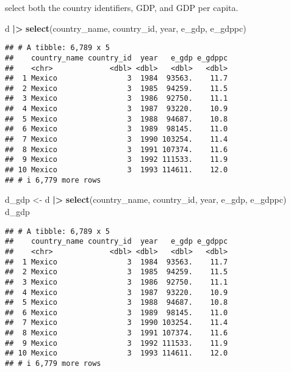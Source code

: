 \documentclass[
]{article}
\newenvironment{Shaded}{\begin{snugshade}}{\end{snugshade}}
\newcommand{\FunctionTok}[1]{\textcolor[rgb]{0.13,0.29,0.53}{\textbf{#1}}}
\newcommand{\NormalTok}[1]{#1}
\newcommand{\OtherTok}[1]{\textcolor[rgb]{0.56,0.35,0.01}{#1}}
\newcommand{\SpecialCharTok}[1]{\textcolor[rgb]{0.81,0.36,0.00}{\textbf{#1}}}
\begin{document}
select both the country identifiers, GDP, and GDP per capita.

\begin{Shaded}
\begin{Highlighting}[]
\NormalTok{d }\SpecialCharTok{|\textgreater{}} \FunctionTok{select}\NormalTok{(country\_name, country\_id, year, e\_gdp, e\_gdppc)}
\end{Highlighting}
\end{Shaded}

\begin{verbatim}
## # A tibble: 6,789 x 5
##    country_name country_id  year   e_gdp e_gdppc
##    <chr>             <dbl> <dbl>   <dbl>   <dbl>
##  1 Mexico                3  1984  93563.    11.7
##  2 Mexico                3  1985  94259.    11.5
##  3 Mexico                3  1986  92750.    11.1
##  4 Mexico                3  1987  93220.    10.9
##  5 Mexico                3  1988  94687.    10.8
##  6 Mexico                3  1989  98145.    11.0
##  7 Mexico                3  1990 103254.    11.4
##  8 Mexico                3  1991 107374.    11.6
##  9 Mexico                3  1992 111533.    11.9
## 10 Mexico                3  1993 114611.    12.0
## # i 6,779 more rows
\end{verbatim}

\begin{Shaded}
\begin{Highlighting}[]
\NormalTok{d\_gdp }\OtherTok{\textless{}{-}}\NormalTok{ d }\SpecialCharTok{|\textgreater{}}
\FunctionTok{select}\NormalTok{(country\_name, country\_id, year, e\_gdp, e\_gdppc)}
\NormalTok{d\_gdp}
\end{Highlighting}
\end{Shaded}

\begin{verbatim}
## # A tibble: 6,789 x 5
##    country_name country_id  year   e_gdp e_gdppc
##    <chr>             <dbl> <dbl>   <dbl>   <dbl>
##  1 Mexico                3  1984  93563.    11.7
##  2 Mexico                3  1985  94259.    11.5
##  3 Mexico                3  1986  92750.    11.1
##  4 Mexico                3  1987  93220.    10.9
##  5 Mexico                3  1988  94687.    10.8
##  6 Mexico                3  1989  98145.    11.0
##  7 Mexico                3  1990 103254.    11.4
##  8 Mexico                3  1991 107374.    11.6
##  9 Mexico                3  1992 111533.    11.9
## 10 Mexico                3  1993 114611.    12.0
## # i 6,779 more rows
\end{verbatim}
\end{document}
